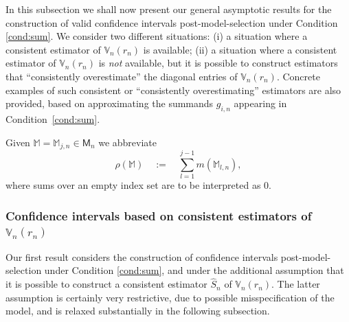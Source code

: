 \documentclass[preprint]{imsart}
\numberwithin{equation}{section}
\begin{document}
In this subsection we shall now present our general asymptotic results for the construction of valid confidence intervals post-model-selection under Condition \ref{cond:sum}. We consider two different situations: (i) a situation where a consistent estimator of $\mathbb{V}_n(r_n)$ is available; (ii) a situation where a consistent estimator of $\mathbb{V}_n(r_n)$ is \textit{not} available, but it is possible to construct estimators that ``consistently overestimate'' the diagonal entries of $\mathbb{V}_n(r_n)$. Concrete examples of such consistent or ``consistently overestimating'' 
estimators are also provided, based on approximating the summands $g_{i,n}$ appearing in Condition~\ref{cond:sum}. 

Given $\mathbb{M} = \mathbb{M}_{j,n} \in \mathsf{M}_n$ we abbreviate
%
\begin{equation*}
\rho(\mathbb{M}) \quad := \quad \sum_{l = 1}^{j-1} m(\mathbb{M}_{l,n}),
\end{equation*}
%
where sums over an empty index set are to be interpreted as $0$. 

\subsubsection{Confidence intervals based on consistent estimators of $\mathbb{V}_n(r_n)$}

Our first result considers the construction of confidence intervals post-model-selection under Condition \ref{cond:sum}, and under the additional assumption that it is possible to construct a consistent estimator $\hat{S}_n$ of $\mathbb{V}_n(r_n)$. The latter assumption is certainly very restrictive, due to possible misspecification of the model, and is relaxed substantially in the following subsection.
\end{document}

